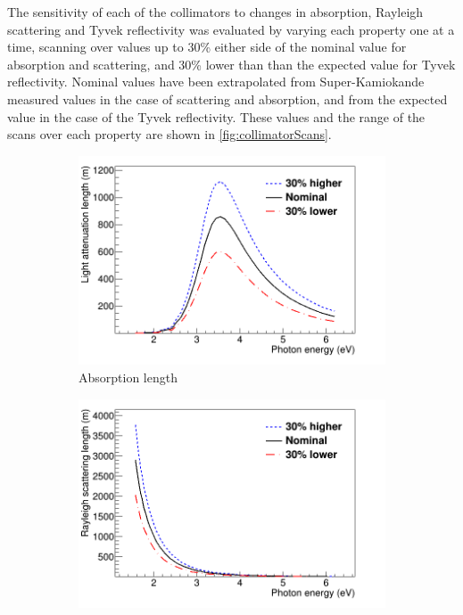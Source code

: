 \documentclass[a4paper,11pt]{article}
\begin{document}
The sensitivity of each of the collimators to changes in absorption, Rayleigh scattering and Tyvek reflectivity was evaluated by varying each property one at a time, scanning over values up to 30\% either side of the nominal value for absorption and scattering, and 30\% lower than than the expected value for Tyvek reflectivity. Nominal values have been extrapolated from Super-Kamiokande measured values in the case of scattering and absorption, and from the expected value in the case of the Tyvek reflectivity. These values and the range of the scans over each property are shown in \cref{fig:collimatorScans}.

\begin{figure}[ht!]
    \centering
    \begin{subfigure}{0.32\textwidth}
         \centering
         \includegraphics[width=\linewidth]{AbsorptionLength.png}
         \caption{Absorption length}
     \end{subfigure}
     \hfill
     \begin{subfigure}{0.32\textwidth}
         \centering
         \includegraphics[width=\linewidth]{RayleighScatteringLength.png}

\end{subfigure}
\end{figure}
\end{document}
